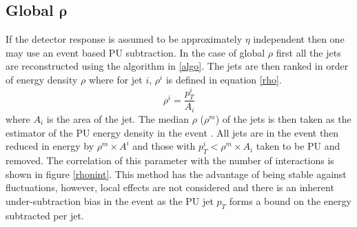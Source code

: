 \subsection{Global $\boldsymbol{\rho}$}
If the detector response is assumed to be approximately $\eta$ independent then one may use an event based PU subtraction. In the case of global $\rho$ first all the jets are reconstructed using the algorithm in \ref{algo}. The jets are then ranked in order of energy density $\rho$ where for jet $i$, $\rho^i$ is defined in equation \ref{rho}.
\begin{equation}
\label{rho}
\rho^i = \frac{p^i_{T}}{A_i} 
\end{equation}
where $A_i$ is the area of the jet. The median $\rho$ ($\rho^m$) of the jets is then taken as the estimator of the PU energy density in the event \cite{jetarea}. All jets are in the event then reduced in energy by $\rho^m \times A^i$ and those with $p_{T}^i < \rho^m \times A_i$ taken to be PU and removed. The correlation of this parameter with the number of interactions is shown in figure \ref{rhonint}. This method has the advantage of being stable against fluctuations, however, local effects are not considered and there is an inherent under-subtraction bias in the event as the PU jet $p_{T}$ forms a bound on the energy subtracted per jet.
